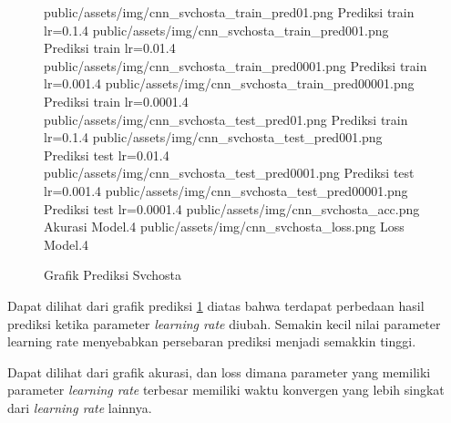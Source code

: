 \documentclass[./skripsi.tex]{subfiles}
\begin{document}
\begin{figure}[H]
\centering
\buatsubgrafik 
{public/assets/img/cnn_svchosta_train_pred01.png}
{Prediksi train lr=0.1}{.4}
\buatsubgrafik 
{public/assets/img/cnn_svchosta_train_pred001.png}
{Prediksi train lr=0.01}{.4}
\buatsubgrafik 
{public/assets/img/cnn_svchosta_train_pred0001.png}
{Prediksi train lr=0.001}{.4}
\buatsubgrafik 
{public/assets/img/cnn_svchosta_train_pred00001.png}
{Prediksi train lr=0.0001}{.4}
\buatsubgrafik 
{public/assets/img/cnn_svchosta_test_pred01.png}
{Prediksi train lr=0.1}{.4}
\buatsubgrafik 
{public/assets/img/cnn_svchosta_test_pred001.png}
{Prediksi test lr=0.01}{.4}
\buatsubgrafik 
{public/assets/img/cnn_svchosta_test_pred0001.png}
{Prediksi test lr=0.001}{.4}
\buatsubgrafik 
{public/assets/img/cnn_svchosta_test_pred00001.png}
{Prediksi test lr=0.0001}{.4}
\buatsubgrafik 
{public/assets/img/cnn_svchosta_acc.png}
{Akurasi Model}{.4}
\buatsubgrafik 
{public/assets/img/cnn_svchosta_loss.png}
{Loss Model}{.4}
\caption{Grafik Prediksi Svchosta}
\label{fig:cnn_svchosta_pred}
\end{figure}
\par Dapat dilihat dari grafik prediksi \ref{fig:cnn_svchosta_pred} diatas bahwa terdapat perbedaan hasil prediksi ketika parameter \textit{learning rate} diubah. Semakin kecil nilai parameter learning rate menyebabkan persebaran prediksi menjadi semakkin tinggi.
\par Dapat dilihat dari grafik akurasi, dan loss dimana parameter yang memiliki parameter \textit{learning rate} terbesar memiliki waktu konvergen yang lebih singkat dari \textit{learning rate} lainnya.
\end{document}
